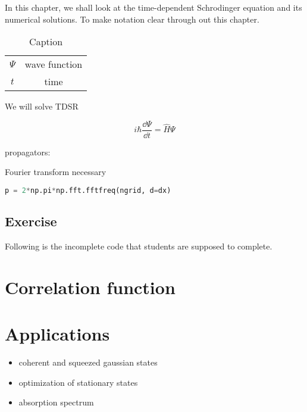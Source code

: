 In this chapter, we shall look at the time-dependent Schrodinger equation and its numerical solutions. To make notation clear through out this chapter.

\begin{table}[ht]
    \centering
    \begin{tabular}{c|c}
         $\Psi$ & wave function \\
         $t$ & time
    \end{tabular}
    \caption{Caption}
    \label{tab:my_label}
\end{table}

We will solve TDSR

\begin{equation}
    i\hbar\frac{\dd\Psi}{\dd t} = \hat{H}\Psi
\end{equation}

propagators:

Fourier transform necessary
\begin{lstlisting}[language=Python, style=mystyle2]
p = 2*np.pi*np.fft.fftfreq(ngrid, d=dx)
\end{lstlisting}

\subsection{Exercise}

Following is the incomplete code that students are supposed to complete.

\lstset{style=mystyle}


\section{Correlation function}



\section{Applications}

\begin{itemize}
    \item coherent and squeezed gaussian states
    \item optimization of stationary states
    \item absorption spectrum
\end{itemize}



